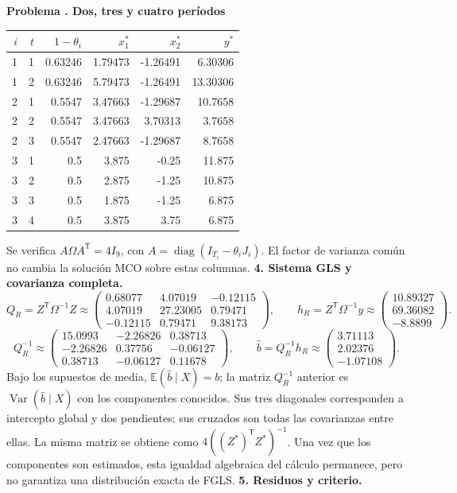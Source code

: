 \documentclass[11pt,a4paper]{article}
\newcommand{\E}{\mathbb E}
\newcommand{\T}{^{\mathsf T}}
\DeclareMathOperator{\Var}{Var}
\DeclareMathOperator{\diag}{diag}
\theoremstyle{definition}
\newcounter{problema}
\newenvironment{resuelto}[1]{\refstepcounter{problema}\par\medskip\Needspace{6\baselineskip}\textbf{Problema \theproblema. #1}\par}{\par\medskip}
\begin{document}
\begin{resuelto}{Dos, tres y cuatro períodos}
\begin{center}\small
\begin{tabular}{rrrrrr}
\toprule
$i$&$t$&$1-\theta_i$&$x_1^*$&$x_2^*$&$y^*$\\
\midrule
1&1&0.63246&1.79473&-1.26491&6.30306\\
1&2&0.63246&5.79473&-1.26491&13.30306\\
2&1&0.5547&3.47663&-1.29687&10.7658\\
2&2&0.5547&3.47663&3.70313&3.7658\\
2&3&0.5547&2.47663&-1.29687&8.7658\\
3&1&0.5&3.875&-0.25&11.875\\
3&2&0.5&2.875&-1.25&10.875\\
3&3&0.5&1.875&-1.25&6.875\\
3&4&0.5&3.875&3.75&6.875\\
\bottomrule
\end{tabular}
\end{center}
Se verifica $A\Omega A\T=4I_{9}$, con $A=\diag(I_{T_i}-\theta_iJ_i)$. El factor de varianza común no cambia la solución MCO sobre estas columnas.
\textbf{4. Sistema GLS y covarianza completa.}
\[
Q_R=Z\T\Omega^{-1}Z\approx\begin{pmatrix}
0.68077&4.07019&-0.12115\\4.07019&27.23005&0.79471\\-0.12115&0.79471&9.38173
\end{pmatrix},\qquad h_R=Z\T\Omega^{-1}y\approx\begin{pmatrix}
10.89327\\69.36082\\-8.8899
\end{pmatrix}.
\]
\[
Q_R^{-1}\approx\begin{pmatrix}
15.0993&-2.26826&0.38713\\-2.26826&0.37756&-0.06127\\0.38713&-0.06127&0.11678
\end{pmatrix},\qquad \widehat b=Q_R^{-1}h_R\approx\begin{pmatrix}
3.71113\\2.02376\\-1.07108
\end{pmatrix}.
\]
Bajo los supuestos de media, $\E(\widehat b\mid X)=b$; la matriz $Q_R^{-1}$ anterior es $\Var(\widehat b\mid X)$ con los componentes conocidos. Sus tres diagonales corresponden a intercepto global y dos pendientes; sus cruzados son todas las covarianzas entre ellas.
La misma matriz se obtiene como $4((Z^*)\T Z^*)^{-1}$. Una vez que los componentes son estimados, esta igualdad algebraica del cálculo permanece, pero no garantiza una distribución exacta de FGLS.
\textbf{5. Residuos y criterio.}


\end{resuelto}
\end{document}
